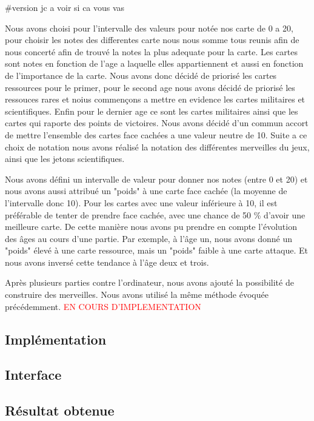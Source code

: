 \documentclass[a4paper, 12pt, french]{article}
\begin{document}
    #version jc a voir si ca vous vas

    Nous avons choisi pour l'intervalle des valeurs pour notée nos carte de 0 a 20, pour choisir les notes des differentes carte
    nous nous somme tous reunis afin de nous concerté afin de trouvé la notes la plus adequate pour la carte. Les cartes sont
    notes en fonction de l'age a laquelle elles appartiennent et aussi en fonction de l'importance de la carte. Nous avons
    donc décidé de priorisé les cartes ressources pour le primer, pour le second age nous avons décidé de priorisé les ressouces
    rares et noius commençons a mettre en evidence les cartes militaires et scientifiques. Enfin pour le dernier age ce sont
    les cartes militaires ainsi que les cartes qui raporte des points de victoires. Nous avons décidé d'un commun accort de
    mettre l'ensemble des cartes face cachées a une valeur neutre de 10. Suite a ce choix de notation nous avons réalisé
    la notation des différentes merveilles du jeux, ainsi que les jetons scientifiques.



	Nous avons défini un intervalle de valeur pour donner nos notes (entre 0 et 20) et nous avons aussi attribué
	un "poids" à une carte face cachée (la moyenne de l'intervalle donc 10). Pour les cartes avec une valeur
	inférieure à 10, il est préférable de tenter de prendre face cachée, avec une chance de 50 \% d'avoir une meilleure
	carte. De cette manière nous avons pu prendre en compte l'évolution des âges au cours d'une partie. Par exemple, à
	l'âge un, nous avons donné un "poids" élevé à une carte ressource, mais un "poids" faible à une carte attaque.
	Et nous avons inversé cette tendance à l'âge deux et trois.

	Après plusieurs parties contre l'ordinateur, nous avons ajouté la possibilité de construire des merveilles.
	Nous avons utilisé la même méthode évoquée précédemment. \textcolor{red}{EN COURS D'IMPLEMENTATION}
	\subsection{Implémentation}
	\subsection{Interface}
	\subsection{Résultat obtenue}
\end{document}
